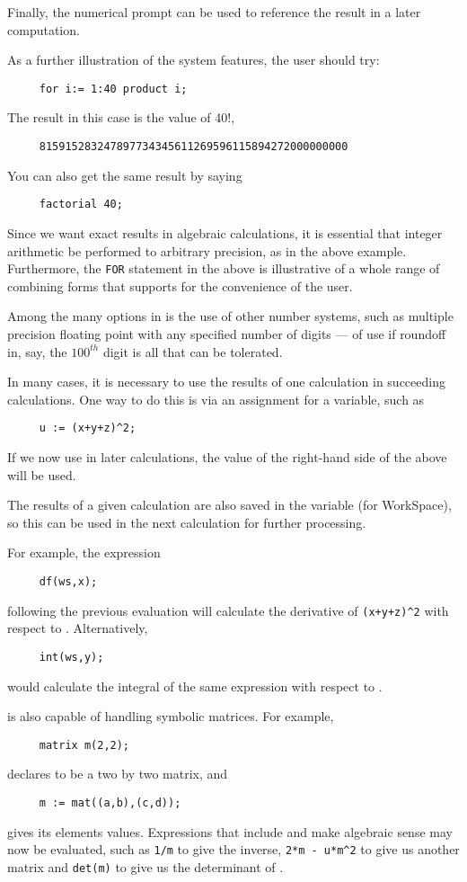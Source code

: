 Finally, the numerical prompt can be used to reference the result in a
later computation.

As a further illustration of the system features, the user should try:
\begin{verbatim}
     for i:= 1:40 product i;
\end{verbatim}
The result in this case is the value of 40!,
\begin{verbatim}
     815915283247897734345611269596115894272000000000
\end{verbatim}
You can also get the same result by saying
\begin{verbatim}
     factorial 40;
\end{verbatim}
Since we want exact results in algebraic calculations, it is essential that
integer arithmetic be performed to arbitrary precision, as in the above
example. Furthermore, the {\tt FOR} statement in the above is illustrative of a
whole range of combining forms that {\REDUCE} supports for the convenience of
the user.

Among the many options in {\REDUCE} is the use of other number systems, such
as multiple precision floating point with any specified number of digits ---
of use if roundoff in, say, the $100^{th}$ digit is all that can be tolerated.

In many cases, it is necessary to use the results of one calculation in
succeeding calculations. One way to do this is via an assignment for a
variable, such as
\begin{verbatim}
     u := (x+y+z)^2;
\end{verbatim}
If we now use  in later calculations, the value of the right-hand
side of the above will be used.

The results of a given calculation are also saved in the variable
 (for WorkSpace), so this can be used in the next
calculation for further processing.

For example, the expression
\begin{verbatim}
     df(ws,x);
\end{verbatim}
following the previous evaluation will calculate the derivative of
\texttt{(x+y+z)\textasciicircum2} with respect to . Alternatively,
\begin{verbatim}
     int(ws,y);
\end{verbatim}
would calculate the integral of the same expression with respect to .

{\REDUCE} is also capable of handling symbolic matrices. For example,
\begin{verbatim}
     matrix m(2,2);
\end{verbatim}
declares  to be a two by two matrix, and
\begin{verbatim}
     m := mat((a,b),(c,d));
\end{verbatim}
gives its elements values.  Expressions that include  and make
algebraic sense may now be evaluated, such as \texttt{1/m} to give the
inverse, \texttt{2*m - u*m\textasciicircum2} to give us another matrix
and \texttt{det(m)} to give us the determinant of .

